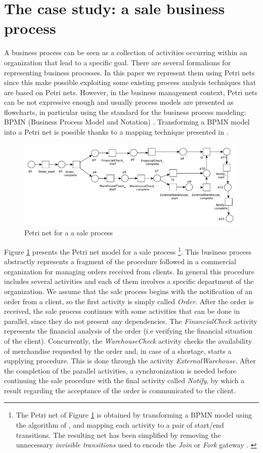 \documentclass{llncs}
\begin{document}
\section{The case study: a sale business process}\label{example}
A business process can be seen as a collection of activities occurring within an organization that lead to a specific goal. There are several formalisms for representing business processes. In this paper we represent them using Petri nets \cite{8}\cite{10} since this make possible exploiting some existing process analysis techniques that are based on Petri nets. However, in the business management context, Petri nets can be not expressive enough and usually process models are presented as flowcharts, in particular using the standard for the business process modeling: BPMN (Business Process Model and Notation) \cite{9}. Transforming a BPMN model into a Petri net is possible thanks to a mapping technique presented in \cite{12}\cite{2}.
\begin{figure}[h]
\includegraphics[width=360pt]
{./items/Sales_PN.pdf}
\caption{Petri net for a a sale process}
\label{pnet}
\end{figure}

Figure \ref{pnet} presents the Petri net model for a sale
process
\footnote{\small{
The Petri net of Figure \ref{pnet} is obtained by
transforming a BPMN model using the algorithm of \cite{2}, and mapping
each activity to a pair of start/end transitions. The resulting net
has been simplified by removing the unnecessary \emph{invisible
  transitions} used to encode the \emph{Join} or \emph{Fork} gateway \cite{2}.
}}.
This business process abstractly represents a fragment of the
procedure followed in a commercial organization for managing orders
received from clients. In general this procedure includes several
activities and each of them involves a specific department of the
organization. We assume that the sale process begins with the
notification of an order from a client, so the first activity is
simply called \emph{Order}. After the order is received, the sale
process continues with some activities that can be done in parallel,
since they do not present any dependencies. The \emph{FinancialCheck}
activity represents the financial analysis of the order  (i.e
verifying the financial situation of the client). Concurrently, the
\emph{WarehouseCheck} activity checks the availability of merchandise
requested by the order and, in case of a shortage, starts a supplying procedure. This is done through the activity \emph{ExternalWarehouse}. After the completion of the  parallel activities, a synchronization is needed before continuing the sale procedure with the final activity called \emph{Notify}, by which a result regarding the acceptance of the order is communicated to the client.
\end{document}
